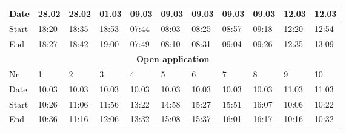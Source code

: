 \begin{table}[H]
\begin{tabular}{|lllllllllll|}
\multicolumn{1}{|l|}{Date}   & \multicolumn{1}{l|}{28.02} & \multicolumn{1}{l|}{28.02} & \multicolumn{1}{l|}{01.03} & \multicolumn{1}{l|}{09.03} & \multicolumn{1}{l|}{09.03} & \multicolumn{1}{l|}{09.03} & \multicolumn{1}{l|}{09.03} & \multicolumn{1}{l|}{09.03} & \multicolumn{1}{l|}{12.03} & 12.03 \\ \hline
\multicolumn{1}{|l|}{Start}  & \multicolumn{1}{l|}{18:20} & \multicolumn{1}{l|}{18:35} & \multicolumn{1}{l|}{18:53} & \multicolumn{1}{l|}{07:44} & \multicolumn{1}{l|}{08:03} & \multicolumn{1}{l|}{08:25} & \multicolumn{1}{l|}{08:57} & \multicolumn{1}{l|}{09:18} & \multicolumn{1}{l|}{12:20} & 12:54 \\ \hline
\multicolumn{1}{|l|}{End}    & \multicolumn{1}{l|}{18:27} & \multicolumn{1}{l|}{18:42} & \multicolumn{1}{l|}{19:00} & \multicolumn{1}{l|}{07:49} & \multicolumn{1}{l|}{08:10} & \multicolumn{1}{l|}{08:31} & \multicolumn{1}{l|}{09:04} & \multicolumn{1}{l|}{09:26} & \multicolumn{1}{l|}{12:35} & 13:09 \\ \hline
\multicolumn{11}{|c|}{\textbf{Open application}}                                                                                                                                                                                                                                                          \\ \hline
\multicolumn{1}{|l|}{Nr} & \multicolumn{1}{l|}{1}     & \multicolumn{1}{l|}{2}     & \multicolumn{1}{l|}{3}     & \multicolumn{1}{l|}{4}     & \multicolumn{1}{l|}{5}     & \multicolumn{1}{l|}{6}     & \multicolumn{1}{l|}{7}     & \multicolumn{1}{l|}{8}     & \multicolumn{1}{l|}{9}     & 10    \\ \hline
\multicolumn{1}{|l|}{Date}   & \multicolumn{1}{l|}{10.03} & \multicolumn{1}{l|}{10.03} & \multicolumn{1}{l|}{10.03} & \multicolumn{1}{l|}{10.03} & \multicolumn{1}{l|}{10.03} & \multicolumn{1}{l|}{10.03} & \multicolumn{1}{l|}{10.03} & \multicolumn{1}{l|}{10.03} & \multicolumn{1}{l|}{11.03} & 11.03 \\ \hline
\multicolumn{1}{|l|}{Start}  & \multicolumn{1}{l|}{10:26} & \multicolumn{1}{l|}{11:06} & \multicolumn{1}{l|}{11:56} & \multicolumn{1}{l|}{13:22} & \multicolumn{1}{l|}{14:58} & \multicolumn{1}{l|}{15:27} & \multicolumn{1}{l|}{15:51} & \multicolumn{1}{l|}{16:07} & \multicolumn{1}{l|}{10:06} & 10:22 \\ \hline
\multicolumn{1}{|l|}{End}    & \multicolumn{1}{l|}{10:36} & \multicolumn{1}{l|}{11:16} & \multicolumn{1}{l|}{12:06} & \multicolumn{1}{l|}{13:32} & \multicolumn{1}{l|}{15:08} & \multicolumn{1}{l|}{15:37} & \multicolumn{1}{l|}{16:01} & \multicolumn{1}{l|}{16:17} & \multicolumn{1}{l|}{10:16} & 10:32 \\ \hline

\end{tabular}
\end{table}
